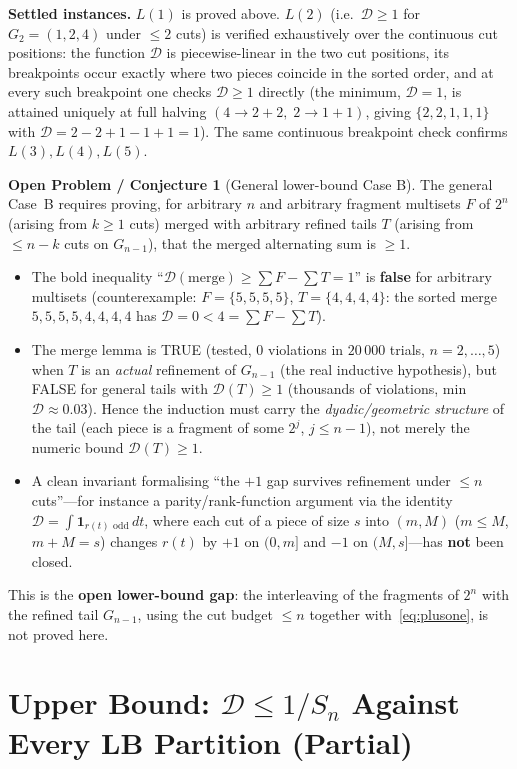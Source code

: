 \documentclass[11pt]{article}
\theoremstyle{definition}
\newtheorem*{openproblem}{Open Problem / Conjecture}
\newcommand{\D}{\mathcal{D}}
\begin{document}
\textbf{Settled instances.} $L(1)$ is proved above. $L(2)$ (i.e.\ $\D\ge 1$ for
$G_2=(1,2,4)$ under $\le 2$ cuts) is verified exhaustively over the continuous
cut positions: the function $\D$ is piecewise-linear in the two cut positions,
its breakpoints occur exactly where two pieces coincide in the sorted order,
and at every such breakpoint one checks $\D\ge 1$ directly (the minimum,
$\D=1$, is attained uniquely at full halving $(4\to2+2,\;2\to1+1)$, giving
$\{2,2,1,1,1\}$ with $\D=2-2+1-1+1=1$). The same continuous breakpoint check
confirms $L(3),L(4),L(5)$.

\begin{openproblem}[General lower-bound Case B]
The general Case~B requires proving, for arbitrary $n$ and arbitrary fragment
multisets $F$ of $2^n$ (arising from $k\ge 1$ cuts) merged with arbitrary
refined tails $T$ (arising from $\le n-k$ cuts on $G_{n-1}$), that the merged
alternating sum is $\ge 1$.
\begin{itemize}[leftmargin=2em]
\item The bold inequality ``$\D(\mathrm{merge})\ge\sum F-\sum T=1$'' is
\textbf{false} for arbitrary multisets (counterexample:
$F=\{5,5,5,5\}$, $T=\{4,4,4,4\}$: the sorted merge
$5,5,5,5,4,4,4,4$ has $\D=0<4=\sum F-\sum T$).
\item The merge lemma is TRUE (tested, $0$ violations in $20\,000$ trials,
$n=2,\dots,5$) when $T$ is an \emph{actual} refinement of $G_{n-1}$ (the real
inductive hypothesis), but FALSE for general tails with $\D(T)\ge 1$ (thousands
of violations, min $\D\approx 0.03$). Hence the induction must carry the
\emph{dyadic/geometric structure} of the tail (each piece is a fragment of some
$2^j$, $j\le n-1$), not merely the numeric bound $\D(T)\ge 1$.
\item A clean invariant formalising ``the $+1$ gap survives refinement under
$\le n$ cuts''---for instance a parity/rank-function argument via the identity
$\D=\int\mathbf{1}_{r(t)\text{ odd}}\,dt$, where each cut of a piece of size
$s$ into $(m,M)$ ($m\le M$, $m+M=s$) changes $r(t)$ by $+1$ on $(0,m]$ and $-1$
on $(M,s]$---has \textbf{not} been closed.
\end{itemize}
This is the \textbf{open lower-bound gap}: the interleaving of the fragments
of $2^n$ with the refined tail $G_{n-1}$, using the cut budget $\le n$ together
with~\eqref{eq:plusone}, is not proved here.
\end{openproblem}

\section{Upper Bound: $\D\le 1/S_n$ Against Every LB Partition (Partial)}
\end{document}
